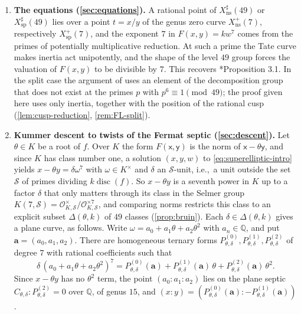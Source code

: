 \documentclass[12pt]{amsart}
\newcommand{\Q}{\mathbb{Q}}
\newcommand{\calS}{{\mathcal S}}
\newcommand{\OO}{{\mathcal O}}
\newcommand{\OKS}{\OO_{K,\calS}}
\newcommand{\x}{\mathsf{x}}
\newcommand{\y}{\mathsf{y}}
\DeclareMathOperator{\ns}{ns}
\DeclareMathOperator{\spc}{sp}
\DeclareMathOperator{\disc}{disc}
\numberwithin{equation}{section}
\theoremstyle{definition}
\begin{document}
\begin{enumerate}[leftmargin=*, itemsep=0.4em]
\item \textbf{The equations (\cref{sec:equations}).} A rational point of
  $X_{\ns}^{\sharp}(49)$ or $X_{\spc}^{\sharp}(49)$ lies over a point $t = x/y$
  of the genus zero curve $X_{\ns}^{+}(7)$, respectively $X_{\spc}^{+}(7)$, and the
  exponent $7$ in $F(x,y) = kw^7$ comes from the primes of potentially
  multiplicative reduction. At such a prime the Tate curve makes inertia act
  unipotently, and the shape of the level $49$ group forces the valuation of
  $F(x,y)$ to be divisible by $7$. This recovers
  \cite{Furio--Lombardo26}*{Proposition 3.1}. In the split case the argument of
  \cite{Furio--Lombardo26} uses an element of the decomposition group that does not exist
  at the primes $p$ with $p^{6} \equiv 1 \pmod{49}$; the proof given here uses
  only inertia, together with the position of the rational cusp
  (\cref{lem:cusp-reduction}, \cref{rem:FL-split}).
\item \textbf{Kummer descent to twists of the Fermat septic
    (\cref{sec:descent}).} Let $\theta \in K$ be a root of $f$. Over $K$ the form
  $F(\x,\y)$ is the norm of $\x - \theta \y$, and since $K$ has class number one, a
  solution $(x,y,w)$ to \cref{eq:superelliptic-intro} yields
  $x - \theta y = \delta\omega^7$ with $\omega \in K^{\times}$ and $\delta$ an
  $\calS$-unit, i.e.,~a unit outside the set $\calS$ of primes dividing
  $k\disc(f)$. So $x-\theta y$ is a
  seventh power in $K$ up to a factor $\delta$ that only matters through its
  class in the Selmer group $K(7,\calS) = \OKS^{\times}/\OKS^{\times 7}$, and
  comparing norms restricts this class to an explicit subset $\Delta(\theta,k)$ of
  $49$ classes (\cref{prop:bruin}). Each $\delta \in \Delta(\theta,k)$ gives a plane
  curve, as follows. Write $\omega = a_0 + a_1\theta + a_2\theta^2$ with $a_n \in
  \Q$, and put $\mathbf{a} = (a_0,a_1,a_2)$. There are homogeneous ternary
  forms $P^{(0)}_{\theta,\delta}, P^{(1)}_{\theta,\delta},
  P^{(2)}_{\theta,\delta}$ of degree $7$ with rational coefficients such that
  \[
    \delta\,(a_0 + a_1\theta + a_2\theta^2)^{7}
    = P^{(0)}_{\theta,\delta}(\mathbf{a}) + P^{(1)}_{\theta,\delta}(\mathbf{a})\,\theta + P^{(2)}_{\theta,\delta}(\mathbf{a})\,\theta^{2}.
  \]
  Since $x - \theta y$ has no $\theta^{2}$ term, the point $(a_0:a_1:a_2)$ lies on the plane septic
  $C_{\theta,\delta} \colon P^{(2)}_{\theta,\delta} = 0$ over $\Q$, of genus
  $15$, and $(x : y) = (P^{(0)}_{\theta,\delta}(\mathbf{a}) : -P^{(1)}_{\theta,\delta}(\mathbf{a}))$.

\end{enumerate}
\end{document}
